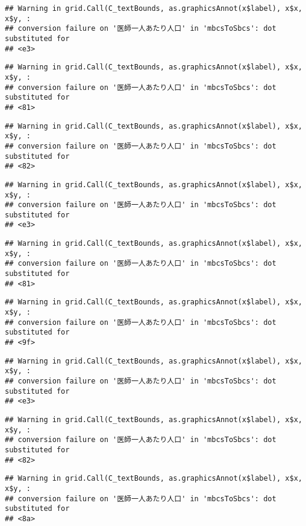 \documentclass[
]{article}
\begin{document}
\begin{verbatim}
## Warning in grid.Call(C_textBounds, as.graphicsAnnot(x$label), x$x, x$y, :
## conversion failure on '医師一人あたり人口' in 'mbcsToSbcs': dot substituted for
## <e3>
\end{verbatim}

\begin{verbatim}
## Warning in grid.Call(C_textBounds, as.graphicsAnnot(x$label), x$x, x$y, :
## conversion failure on '医師一人あたり人口' in 'mbcsToSbcs': dot substituted for
## <81>
\end{verbatim}

\begin{verbatim}
## Warning in grid.Call(C_textBounds, as.graphicsAnnot(x$label), x$x, x$y, :
## conversion failure on '医師一人あたり人口' in 'mbcsToSbcs': dot substituted for
## <82>
\end{verbatim}

\begin{verbatim}
## Warning in grid.Call(C_textBounds, as.graphicsAnnot(x$label), x$x, x$y, :
## conversion failure on '医師一人あたり人口' in 'mbcsToSbcs': dot substituted for
## <e3>
\end{verbatim}

\begin{verbatim}
## Warning in grid.Call(C_textBounds, as.graphicsAnnot(x$label), x$x, x$y, :
## conversion failure on '医師一人あたり人口' in 'mbcsToSbcs': dot substituted for
## <81>
\end{verbatim}

\begin{verbatim}
## Warning in grid.Call(C_textBounds, as.graphicsAnnot(x$label), x$x, x$y, :
## conversion failure on '医師一人あたり人口' in 'mbcsToSbcs': dot substituted for
## <9f>
\end{verbatim}

\begin{verbatim}
## Warning in grid.Call(C_textBounds, as.graphicsAnnot(x$label), x$x, x$y, :
## conversion failure on '医師一人あたり人口' in 'mbcsToSbcs': dot substituted for
## <e3>
\end{verbatim}

\begin{verbatim}
## Warning in grid.Call(C_textBounds, as.graphicsAnnot(x$label), x$x, x$y, :
## conversion failure on '医師一人あたり人口' in 'mbcsToSbcs': dot substituted for
## <82>
\end{verbatim}

\begin{verbatim}
## Warning in grid.Call(C_textBounds, as.graphicsAnnot(x$label), x$x, x$y, :
## conversion failure on '医師一人あたり人口' in 'mbcsToSbcs': dot substituted for
## <8a>
\end{verbatim}
\end{document}
